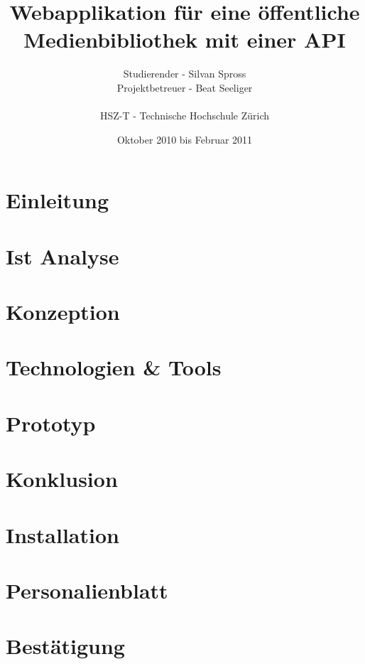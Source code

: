 \documentclass[abstracton,liststotoc,bibtotoc]{scrreprt}
\title{Webapplikation für eine öffentliche Medienbibliothek mit einer API}
\author{Studierender - Silvan Spross\\
    Projektbetreuer - Beat Seeliger\\
    \\
    HSZ-T - Technische Hochschule Zürich}
\date{Oktober 2010 bis Februar 2011}
\begin{document}
    \ifpdf
    \else
    \fi
    

    \maketitle
    
    
    

    \tableofcontents
    
    \clearpage

    \chapter{Einleitung}
    
    
    \chapter{Ist Analyse}
    
    
    \chapter{Konzeption}
    
    
    \chapter{Technologien \& Tools}
    
    
    \chapter{Prototyp}
    
    
    \chapter{Konklusion}
    
    
    \chapter{Installation}
    
    
    \appendix
    
    \chapter{Personalienblatt}
    
    
    \chapter{Bestätigung}
    
    
    \listoffigures

    \listoftables
    
    
    
    
\end{document}
